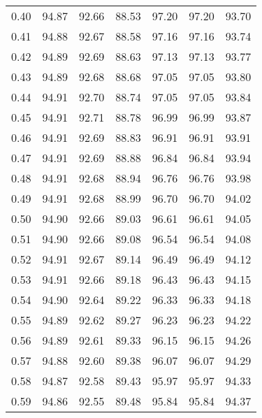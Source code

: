 \begin{tabular}{|c|c|c|c|c|c|c|}
      0.40 &     94.87 &     92.66 &      88.53 &   97.20 &      97.20 &         93.70 \\
      0.41 &     94.88 &     92.67 &      88.58 &   97.16 &      97.16 &         93.74 \\
      0.42 &     94.89 &     92.69 &      88.63 &   97.13 &      97.13 &         93.77 \\
      0.43 &     94.89 &     92.68 &      88.68 &   97.05 &      97.05 &         93.80 \\
      0.44 &     94.91 &     92.70 &      88.74 &   97.05 &      97.05 &         93.84 \\
      0.45 &     94.91 &     92.71 &      88.78 &   96.99 &      96.99 &         93.87 \\
      0.46 &     94.91 &     92.69 &      88.83 &   96.91 &      96.91 &         93.91 \\
      0.47 &     94.91 &     92.69 &      88.88 &   96.84 &      96.84 &         93.94 \\
      0.48 &     94.91 &     92.68 &      88.94 &   96.76 &      96.76 &         93.98 \\
      0.49 &     94.91 &     92.68 &      88.99 &   96.70 &      96.70 &         94.02 \\
      0.50 &     94.90 &     92.66 &      89.03 &   96.61 &      96.61 &         94.05 \\
      0.51 &     94.90 &     92.66 &      89.08 &   96.54 &      96.54 &         94.08 \\
      0.52 &     94.91 &     92.67 &      89.14 &   96.49 &      96.49 &         94.12 \\
      0.53 &     94.91 &     92.66 &      89.18 &   96.43 &      96.43 &         94.15 \\
      0.54 &     94.90 &     92.64 &      89.22 &   96.33 &      96.33 &         94.18 \\
      0.55 &     94.89 &     92.62 &      89.27 &   96.23 &      96.23 &         94.22 \\
      0.56 &     94.89 &     92.61 &      89.33 &   96.15 &      96.15 &         94.26 \\
      0.57 &     94.88 &     92.60 &      89.38 &   96.07 &      96.07 &         94.29 \\
      0.58 &     94.87 &     92.58 &      89.43 &   95.97 &      95.97 &         94.33 \\
      0.59 &     94.86 &     92.55 &      89.48 &   95.84 &      95.84 &         94.37 \\

\end{tabular}
